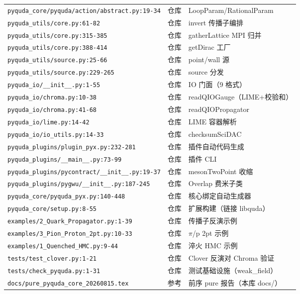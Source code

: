 \documentclass[UTF8]{ctexart}
\begin{document}
\begin{xltabular}{\textwidth}{llX}
\texttt{\nolinkurl{pyquda_core/pyquda/action/abstract.py:19-34}} & 仓库 & LoopParam/RationalParam \\
\texttt{\nolinkurl{pyquda_utils/core.py:61-82}} & 仓库 & invert 传播子编排 \\
\texttt{\nolinkurl{pyquda_utils/core.py:315-385}} & 仓库 & gatherLattice MPI 归并 \\
\texttt{\nolinkurl{pyquda_utils/core.py:388-414}} & 仓库 & getDirac 工厂 \\
\texttt{\nolinkurl{pyquda_utils/source.py:25-66}} & 仓库 & point/wall 源 \\
\texttt{\nolinkurl{pyquda_utils/source.py:229-265}} & 仓库 & source 分发 \\
\texttt{\nolinkurl{pyquda_io/__init__.py:1-55}} & 仓库 & IO 门面（9 格式） \\
\texttt{\nolinkurl{pyquda_io/chroma.py:10-38}} & 仓库 & readQIOGauge（LIME+校验和） \\
\texttt{\nolinkurl{pyquda_io/chroma.py:41-68}} & 仓库 & readQIOPropagator \\
\texttt{\nolinkurl{pyquda_io/lime.py:14-42}} & 仓库 & LIME 容器解析 \\
\texttt{\nolinkurl{pyquda_io/io_utils.py:14-33}} & 仓库 & checksumSciDAC \\
\texttt{\nolinkurl{pyquda_plugins/plugin_pyx.py:232-281}} & 仓库 & 插件自动代码生成 \\
\texttt{\nolinkurl{pyquda_plugins/__main__.py:73-99}} & 仓库 & 插件 CLI \\
\texttt{\nolinkurl{pyquda_plugins/pycontract/__init__.py:19-37}} & 仓库 & mesonTwoPoint 收缩 \\
\texttt{\nolinkurl{pyquda_plugins/pygwu/__init__.py:187-245}} & 仓库 & Overlap 费米子类 \\
\texttt{\nolinkurl{pyquda_core/pyquda_pyx.py:140-448}} & 仓库 & 核心绑定自动生成器 \\
\texttt{\nolinkurl{pyquda_core/setup.py:8-55}} & 仓库 & 扩展构建（链接 libquda） \\
\texttt{\nolinkurl{examples/2_Quark_Propagator.py:1-39}} & 仓库 & 传播子反演示例 \\
\texttt{\nolinkurl{examples/3_Pion_Proton_2pt.py:10-33}} & 仓库 & $\pi$/p 2pt 示例 \\
\texttt{\nolinkurl{examples/1_Quenched_HMC.py:9-44}} & 仓库 & 淬火 HMC 示例 \\
\texttt{\nolinkurl{tests/test_clover.py:1-21}} & 仓库 & Clover 反演对 Chroma 验证 \\
\texttt{\nolinkurl{tests/check_pyquda.py:1-31}} & 仓库 & 测试基础设施（weak\_field） \\
\texttt{\nolinkurl{docs/pure_pyquda_core_20260815.tex}} & 参考 & 前序 pure 报告（本库 docs/） \\
\bottomrule
\end{xltabular}
\end{document}
